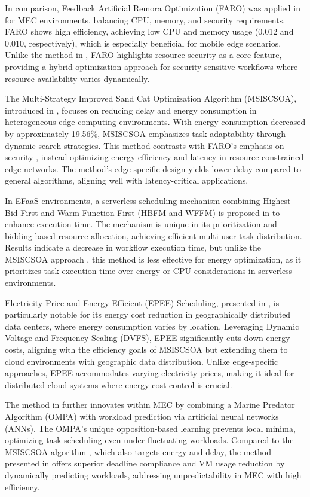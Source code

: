 \documentclass[a4paper, final]{article}
\begin{document}
In comparison, Feedback Artificial Remora Optimization (FARO) was applied in \cite{bib:2_faro} for MEC 
environments, balancing CPU, memory, and security requirements. FARO shows high efficiency, achieving low 
CPU and memory usage (0.012 and 0.010, respectively), which is especially beneficial for mobile edge scenarios.
Unlike the method in \cite{bib:1_acrl}, FARO highlights resource security as a core feature, providing a 
hybrid optimization approach for security-sensitive workflows where resource availability varies dynamically.

The Multi-Strategy Improved Sand Cat Optimization Algorithm (MSISCSOA), introduced in \cite{bib:3_sandcat}, 
focuses on reducing delay and energy consumption in heterogeneous edge computing environments. With energy 
consumption decreased by approximately 19.56\%, MSISCSOA emphasizes task adaptability through dynamic search 
strategies. This method contrasts with FARO’s emphasis on security \cite{bib:2_faro}, instead optimizing 
energy efficiency and latency in resource-constrained edge networks. The method’s edge-specific design yields 
lower delay compared to general algorithms, aligning well with latency-critical applications.

In EFaaS environments, a serverless scheduling mechanism combining Highest Bid First and Warm Function 
First (HBFM and WFFM) is proposed in \cite{bib:4_faas} to enhance execution time. The mechanism is unique 
in its prioritization and bidding-based resource allocation, achieving efficient multi-user task distribution. 
Results indicate a decrease in workflow execution time, but unlike the MSISCSOA approach \cite{bib:3_sandcat}, 
this method is less effective for energy optimization, as it prioritizes task execution time over energy or 
CPU considerations in serverless environments.

Electricity Price and Energy-Efficient (EPEE) Scheduling, presented in \cite{bib:5_epee}, is particularly 
notable for its energy cost reduction in geographically distributed data centers, where energy consumption 
varies by location. Leveraging Dynamic Voltage and Frequency Scaling (DVFS), EPEE significantly cuts down
energy costs, aligning with the efficiency goals of MSISCSOA \cite{bib:3_sandcat} but extending them to cloud 
environments with geographic data distribution. Unlike edge-specific approaches, EPEE accommodates varying 
electricity prices, making it ideal for distributed cloud systems where energy cost control is crucial.

The method in \cite{bib:6_marine} further innovates within MEC by combining a Marine Predator Algorithm 
(OMPA) with workload prediction via artificial neural networks (ANNs). The OMPA’s unique opposition-based 
learning prevents local minima, optimizing task scheduling even under fluctuating workloads. Compared to the 
MSISCSOA algorithm \cite{bib:3_sandcat}, which also targets energy and delay, the method presented in 
\cite{bib:6_marine} offers superior deadline compliance and VM usage reduction by dynamically predicting 
workloads, addressing unpredictability in MEC with high efficiency.
\end{document}
